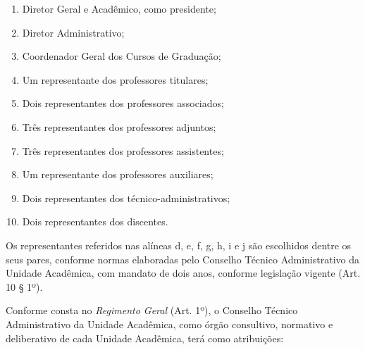 \documentclass[
	12pt,				%
	openright,			%
  oneside,     %
	a4paper,			%
 hyphens,
	chapter=TITLE,		%
	english,			%
	french,				%
	spanish,			%
	brazil				%
	]{abntex2}
\begin{document}
\begin{enumerate}
    \item Diretor Geral e Acadêmico, como presidente;
    \item Diretor Administrativo; 	
    \item Coordenador Geral dos Cursos de Graduação; 	
    \item Um representante dos professores titulares;
    \item Dois representantes dos professores associados;	
    \item Três representantes dos professores adjuntos; 	
    \item Três representantes dos professores assistentes; 	
    \item Um representante dos professores auxiliares; 	
    \item Dois representantes dos técnico-administrativos; 	
    \item Dois representantes dos discentes.
\end{enumerate}

Os representantes referidos nas alíneas d, e, f, g, h, i e j são escolhidos dentre os seus pares, conforme normas elaboradas pelo Conselho Técnico Administrativo da Unidade Acadêmica, com mandato de dois anos, conforme legislação vigente (Art. 10 § 1º).

Conforme consta no \textit{Regimento Geral} (Art. 1º), o Conselho Técnico Administrativo da Unidade Acadêmica, como órgão consultivo, normativo e deliberativo de cada Unidade Acadêmica, terá como atribuições:
\end{document}
